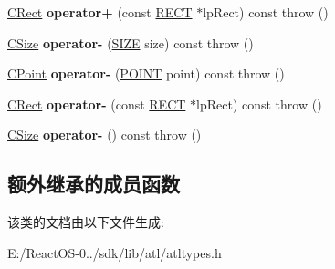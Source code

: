 \begin{DoxyCompactItemize}
\item 
\mbox{\label{class_c_size_a7b5bf556c22ddbb6fc335c00b616ee1f}} 
\hyperlink{class_c_rect}{C\+Rect} {\bfseries operator+} (const \hyperlink{structtag_r_e_c_t}{R\+E\+CT} $\ast$lp\+Rect) const  throw ()
\item 
\mbox{\label{class_c_size_a2048693c2f2da845d79c8d147527dea7}} 
\hyperlink{class_c_size}{C\+Size} {\bfseries operator-\/} (\hyperlink{structtag_s_i_z_e}{S\+I\+ZE} size) const  throw ()
\item 
\mbox{\label{class_c_size_aaf3115bbf2fad6f8554435aa3ef9e015}} 
\hyperlink{class_c_point}{C\+Point} {\bfseries operator-\/} (\hyperlink{structtag_p_o_i_n_t}{P\+O\+I\+NT} point) const  throw ()
\item 
\mbox{\label{class_c_size_afb4ffc7fd9ee3e5c7ffd6259df1dad92}} 
\hyperlink{class_c_rect}{C\+Rect} {\bfseries operator-\/} (const \hyperlink{structtag_r_e_c_t}{R\+E\+CT} $\ast$lp\+Rect) const  throw ()
\item 
\mbox{\label{class_c_size_aec66853f957856feee0d3df509ce7d9a}} 
\hyperlink{class_c_size}{C\+Size} {\bfseries operator-\/} () const  throw ()
\end{DoxyCompactItemize}
\subsection*{额外继承的成员函数}


该类的文档由以下文件生成\+:\begin{DoxyCompactItemize}
\item 
E\+:/\+React\+O\+S-\/0../sdk/lib/atl/atltypes.\+h\end{DoxyCompactItemize}
